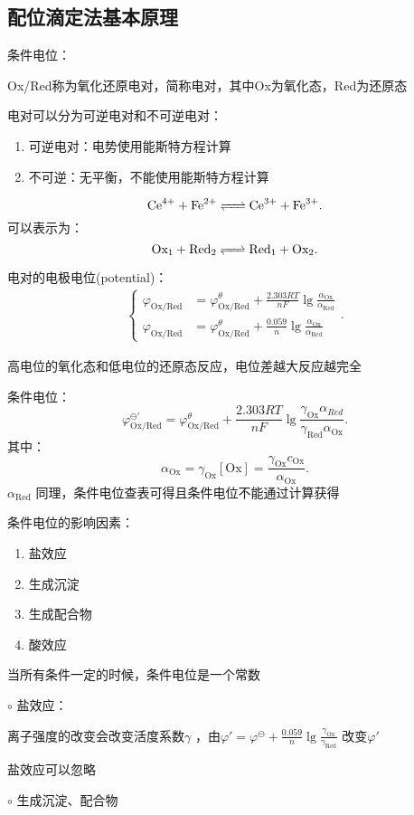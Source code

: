 \subsection{配位滴定法基本原理}%
\label{sub:配位滴定法基本原理}
条件电位：
\begin{defi}
Ox/Red称为氧化还原电对，简称电对，其中Ox为氧化态，Red为还原态
\end{defi}
\begin{notation}
    电对可以分为可逆电对和不可逆电对：
    \begin{enumerate}
        \item 可逆电对：电势使用能斯特方程计算
        \item 不可逆：无平衡，不能使用能斯特方程计算
    \end{enumerate}
\end{notation}
\begin{eg}
     \[
         \ce{Ce^4+ +Fe^2+}\ce{<=>[][]}\ce{Ce^3+ +Fe^3+}
     .\]
     可以表示为：
      \[
         \text{Ox}_1+\text{Red}_2 \ce{<=>[][]} \text{Red}_1+\text{Ox}_2
     .\]
\end{eg}
电对的电极电位(potential)：
\begin{align*}
    \begin{cases}
        \varphi_\text{Ox/Red}&= \varphi_\text{Ox/Red}^\theta+\frac{2.303RT}{nF}\lg \frac{\alpha_\text{Ox}}{\alpha_\text{Red}} \\
        \varphi_\text{Ox/Red}&= \varphi_\text{Ox/Red}^\theta+\frac{0.059}{n}\lg \frac{\alpha_\text{Ox}}{\alpha_\text{Red}}
    \end{cases}
.\end{align*}
\begin{notation}
    高电位的氧化态和低电位的还原态反应，电位差越大反应越完全
\end{notation}
条件电位：\[
    \varphi_\text{Ox/Red}^{\ominus'}=\varphi_\text{Ox/Red}^\theta+\frac{2.303RT}{nF}\lg \frac{\gamma_\text{Ox}\alpha_{Red}}{\gamma_\text{Red}\alpha_\text{Ox}}
.\]
其中：\[
    \alpha_\text{Ox}=\gamma_\text{Ox}[\text{Ox}]=\frac{\gamma_\text{Ox}c_\text{Ox}}{\alpha_\text{Ox}}
.\]
$\alpha_\text{Red}$ 同理，条件电位查表可得且条件电位不能通过计算获得
\begin{notation}
条件电位的影响因素：
\begin{enumerate}
    \item 盐效应
    \item 生成沉淀
    \item 生成配合物
    \item 酸效应
\end{enumerate}
当所有条件一定的时候，条件电位是一个常数
\end{notation}
$\circ$ 盐效应：

离子强度的改变会改变活度系数$\gamma$ ，由$\varphi'=\varphi^{\ominus}+\frac{0.059}{n}\lg \frac{\gamma_\text{Ox}}{\gamma_\text{Red}}$ 改变$\varphi'$

盐效应可以忽略

$\circ$ 生成沉淀、配合物
